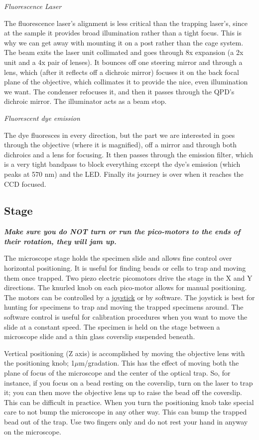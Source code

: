 \documentclass{../lab}
\begin{document}
\emph{Fluorescence Laser}

The fluorescence laser's alignment is less critical than the trapping laser's, since at the sample it provides broad illumination rather than a tight focus. This is why we can get away with mounting it on a post rather than the cage system. The beam exits the laser unit collimated and goes through 8x expansion (a 2x unit and a 4x pair of lenses). It bounces off one steering mirror and through a lens, which (after it reflects off a dichroic mirror) focuses it on the back focal plane of the objective, which collimates it to provide the nice, even illumination we want. The condenser refocuses it, and then it passes through the QPD's dichroic mirror. The illuminator acts as a beam stop.

\emph{Fluorescent dye emission}

The dye fluoresces in every direction, but the part we are interested in goes through the objective (where it is magnified), off a mirror and through both dichroics and a lens for focusing. It then passes through the emission filter, which is a very tight bandpass to block everything except the dye's emission (which peaks at 570 nm) and the LED. Finally its journey is over when it reaches the CCD focused.

\subsection{Stage}

\emph{\textbf{Make sure you do NOT turn or run the pico-motors to the ends of their rotation, they will jam up.}}

\newpage

The microscope stage holds the specimen slide and allows fine control over horizontal positioning. It is useful for finding beads or cells to trap and moving them once trapped. Two piezo electric picomotors drive the stage in the X and Y directions. The knurled knob on each pico-motor allows for manual positioning. The motors can be controlled by a \href{http://experimentationlab.berkeley.edu/sites/default/files/JoystickManual.pdf}{joystick} or by software. The joystick is best for hunting for specimens to trap and moving the trapped specimens around. The software control is useful for calibration procedures when you want to move the slide at a constant speed. The specimen is held on the stage between a microscope slide and a thin glass coverslip suspended beneath.

Vertical positioning (Z axis) is accomplished by moving the objective lens with the positioning knob; 1$\mu$m/gradation. This has the effect of moving both the plane of focus of the microscope and the center of the optical trap. So, for instance, if you focus on a bead resting on the coverslip, turn on the laser to trap it; you can then move the objective lens up to raise the bead off the coverslip. This can be difficult in practice. When you turn the positioning knob take special care to not bump the microscope in any other way. This can bump the trapped bead out of the trap. Use two fingers only and do not rest your hand in anyway on the microscope.
\end{document}
